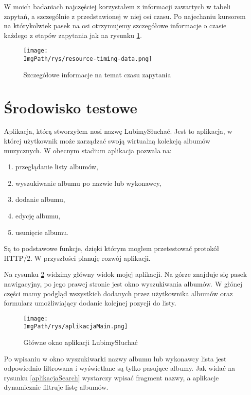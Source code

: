 \documentclass[a4paper,12pt,twoside,openany]{report}
\newcommand{\ImgPath}{.}
\begin{document}
W moich badaniach najczęściej korzystałem z informacji zawartych w tabeli zapytań, a szczególnie z przedstawionej w niej osi czasu.
Po najechaniu kursorem na którykolwiek pasek na osi otrzymujemy szczegółowe informacje o czasie każdego z etapów zapytania jak na rysunku \ref{schematResourceTiming}.

\begin{figure}[!htbp]
	\begin{center}
\centering
\texttt{[image: \\ImgPath/rys/resource-timing-data.png]}
\end{center}
	\caption{Szczegółowe informacje na temat czasu zapytania}
	\label{schematResourceTiming}
\end{figure}

\section{Środowisko testowe}

Aplikacja, którą stworzyłem nosi nazwę LubimySłuchać. 
Jest to aplikacja, w której użytkownik może zarządzać swoją wirtualną kolekcją albumów muzycznych.
W obecnym stadium aplikacja pozwala na:
\begin{enumerate}
	\item przeglądanie listy albumów,
	\item wyszukiwanie albumu po nazwie lub wykonawcy,
	\item dodanie albumu,
	\item edycję albumu,
	\item usunięcie albumu.
\end{enumerate}
Są to podstawowe funkcje, dzięki którym mogłem przetestować protokół HTTP/2. W przyszłości planuję rozwój aplikacji.

Na rysunku \ref{aplikacjaMain} widzimy główny widok mojej aplikacji.
Na górze znajduje się pasek nawigacyjny, po jego prawej stronie jest okno wyszukiwania albumów.
W głónej części mamy podgląd wszystkich dodanych przez użytkownika albumów oraz formularz umożliwiający dodanie kolejnej pozycji do listy.
\begin{figure}[!htbp]
	\begin{center}
\centering
\texttt{[image: \\ImgPath/rys/aplikacjaMain.png]}
\end{center}
	\caption{Główne okno aplikacji LubimySłuchać}
	\label{aplikacjaMain}
\end{figure}

Po wpisaniu w okno wyszukiwarki nazwy albumu lub wykonawcy lista jest odpowiednio filtrowana i wyświetlane są tylko pasujące albumy.
Jak widać na rysunku \ref{aplikacjaSearch} wystarczy wpisać fragment nazwy, a aplikacje dynamicznie filtruje listę albumów.
\end{document}
